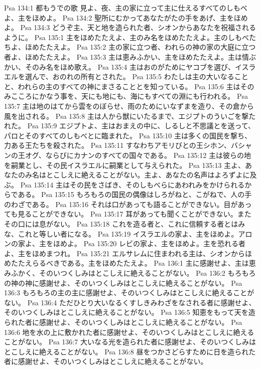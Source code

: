 Psa 134:1  都もうでの歌 見よ、夜、主の家に立って主に仕えるすべてのしもべよ、主をほめよ。
Psa 134:2  聖所にむかってあなたがたの手をあげ、主をほめよ。
Psa 134:3  どうぞ主、天と地を造られた者、シオンからあなたを祝福されるように。
Psa 135:1  主をほめたたえよ、主のみ名をほめたたえよ。主のしもべたちよ、ほめたたえよ。
Psa 135:2  主の家に立つ者、われらの神の家の大庭に立つ者よ、ほめたたえよ。
Psa 135:3  主は恵みふかい、主をほめたたえよ。主は情ぶかい、そのみ名をほめ歌え。
Psa 135:4  主はおのがためにヤコブを選び、イスラエルを選んで、おのれの所有とされた。
Psa 135:5  わたしは主の大いなることと、われらの主のすべての神にまさることとを知っている。
Psa 135:6  主はそのみこころにかなう事を、天にも地にも、海にもすべての淵にも行われる。
Psa 135:7  主は地のはてから雲をのぼらせ、雨のためにいなずまを造り、その倉から風を出される。
Psa 135:8  主は人から獣にいたるまで、エジプトのういごを撃たれた。
Psa 135:9  エジプトよ、主はおまえの中に、しるしと不思議とを送って、パロとそのすべてのしもべとに臨まれた。
Psa 135:10  主は多くの国民を撃ち、力ある王たちを殺された。
Psa 135:11  すなわちアモリびとの王シホン、バシャンの王オグ、ならびにカナンのすべての国々である。
Psa 135:12  主は彼らの地を嗣業とし、その民イスラエルに嗣業として与えられた。
Psa 135:13  主よ、あなたのみ名はとこしえに絶えることがない。主よ、あなたの名声はよろずよに及ぶ。
Psa 135:14  主はその民をさばき、そのしもべらにあわれみをかけられるからである。
Psa 135:15  もろもろの国民の偶像はしろがねと、こがねで、人の手のわざである。
Psa 135:16  それは口があっても語ることができない。目があっても見ることができない。
Psa 135:17  耳があっても聞くことができない。またその口には息がない。
Psa 135:18  これを造る者と、これに信頼する者とはみな、これと等しい者になる。
Psa 135:19  イスラエルの家よ、主をほめよ。アロンの家よ、主をほめよ。
Psa 135:20  レビの家よ、主をほめよ。主を恐れる者よ、主をほめまつれ。
Psa 135:21  エルサレムに住まわれる主は、シオンからほめたたえらるべきである。主をほめたたえよ。
Psa 136:1  主に感謝せよ、主は恵みふかく、そのいつくしみはとこしえに絶えることがない。
Psa 136:2  もろもろの神の神に感謝せよ、そのいつくしみはとこしえに絶えることがない。
Psa 136:3  もろもろの主の主に感謝せよ、そのいつくしみはとこしえに絶えることがない。
Psa 136:4  ただひとり大いなるくすしきみわざをなされる者に感謝せよ、そのいつくしみはとこしえに絶えることがない。
Psa 136:5  知恵をもって天を造られた者に感謝せよ、そのいつくしみはとこしえに絶えることがない。
Psa 136:6  地を水の上に敷かれた者に感謝せよ、そのいつくしみはとこしえに絶えることがない。
Psa 136:7  大いなる光を造られた者に感謝せよ、そのいつくしみはとこしえに絶えることがない。
Psa 136:8  昼をつかさどらすために日を造られた者に感謝せよ、そのいつくしみはとこしえに絶えることがない。
